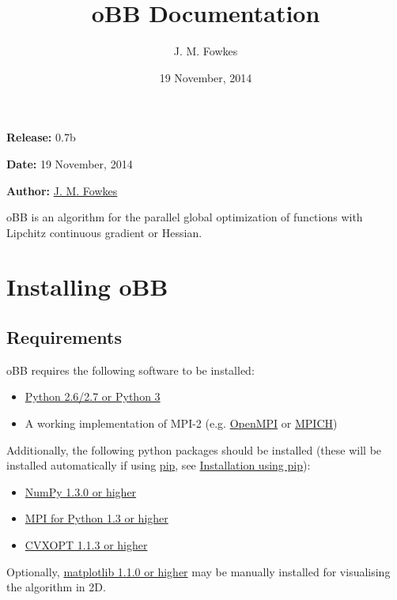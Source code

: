 \documentclass[letterpaper,11pt,openany,oneside]{sphinxmanual}
\title{oBB Documentation}
\date{19 November, 2014}
\author{J. M. Fowkes}
\begin{document}
\maketitle
\tableofcontents
{}\label{index::doc}


\textbf{Release:} 0.7b

\textbf{Date:} 19 November, 2014

\textbf{Author:} \href{mailto:jaroslav.fowkes@ed.ac.uk}{J. M. Fowkes}

oBB is an algorithm for the parallel global optimization of functions with Lipchitz continuous gradient or Hessian.


\chapter{Installing oBB}
\label{install::doc}\label{install:installing-obb}\label{install:overlapping-branch-and-bound}

\section{Requirements}
\label{install:requirements}
oBB requires the following software to be installed:
\begin{itemize}
\item {} 
\href{http://www.python.org/}{Python 2.6/2.7 or Python 3}

\item {} 
A working implementation of MPI-2 (e.g. \href{http://www.open-mpi.org/}{OpenMPI} or \href{http://www.mpich.org/}{MPICH})

\end{itemize}

Additionally, the following python packages should be installed (these will be installed automatically if using \href{http://www.pip-installer.org/}{pip}, see {\hyperref[install:installation-using-pip]{Installation using pip}}):
\begin{itemize}
\item {} 
\href{http://www.numpy.org/}{NumPy 1.3.0 or higher}

\item {} 
\href{http://mpi4py.scipy.org/}{MPI for Python 1.3 or higher}

\item {} 
\href{http://cvxopt.org/}{CVXOPT 1.1.3 or higher}

\end{itemize}

Optionally, \href{http://www.matplotlib.org/}{matplotlib 1.1.0 or higher} may be manually installed for visualising the algorithm in 2D.
\end{document}
